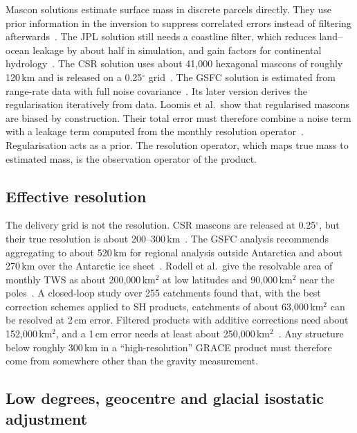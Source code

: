 Mascon solutions estimate surface mass in discrete parcels directly. They use prior information in the inversion to suppress correlated errors instead of filtering afterwards~\cite{wiese2016leakage,luthcke2013iterated,loomis2019regularization}. The JPL solution still needs a coastline filter, which reduces land--ocean leakage by about half in simulation, and gain factors for continental hydrology~\cite{wiese2016leakage}. The CSR solution uses about 41{,}000 hexagonal mascons of roughly 120\,km and is released on a 0.25$^\circ$ grid~\cite{bonin2026ocean}. The GSFC solution is estimated from range-rate data with full noise covariance~\cite{luthcke2013iterated}. Its later version derives the regularisation iteratively from data. Loomis et al.\ show that regularised mascons are biased by construction. Their total error must therefore combine a noise term with a leakage term computed from the monthly resolution operator~\cite{loomis2019regularization}. Regularisation acts as a prior. The resolution operator, which maps true mass to estimated mass, is the observation operator of the product.

\subsection{Effective resolution}

The delivery grid is not the resolution. CSR mascons are released at 0.25$^\circ$, but their true resolution is about 200--300\,km~\cite{bonin2026ocean}. The GSFC analysis recommends aggregating to about 520\,km for regional analysis outside Antarctica and about 270\,km over the Antarctic ice sheet~\cite{loomis2019regularization}. Rodell et al.\ give the resolvable area of monthly TWS as about 200{,}000\,km$^2$ at low latitudes and 90{,}000\,km$^2$ near the poles~\cite{rodell2018emerging}. A closed-loop study over 255 catchments found that, with the best correction schemes applied to SH products, catchments of about 63{,}000\,km$^2$ can be resolved at 2\,cm error. Filtered products with additive corrections need about 152{,}000\,km$^2$, and a 1\,cm error needs at least about 250{,}000\,km$^2$~\cite{vishwakarma2018resolution}. Any structure below roughly 300\,km in a ``high-resolution'' GRACE product must therefore come from somewhere other than the gravity measurement.

\subsection{Low degrees, geocentre and glacial isostatic adjustment}

